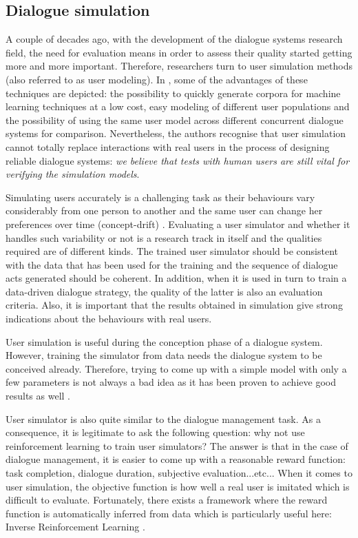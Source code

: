 	
	\subsection{Dialogue simulation}
	
		A couple of decades ago, with the development of the dialogue systems research field, the need for evaluation means in order to assess their quality started getting more and more important. Therefore, researchers turn to user simulation methods (also referred to as user modeling). In \cite{Eckert1997}, some of the advantages of these techniques are depicted: the possibility to quickly generate corpora for machine learning techniques at a low cost, easy modeling of different user populations and the possibility of using the same user model across different concurrent dialogue systems for comparison. Nevertheless, the authors recognise that user simulation cannot totally replace interactions with real users in the process of designing reliable dialogue systems: \textit{we believe that tests with human users are still vital for verifying the simulation models}.
			
			Simulating users accurately is a challenging task as their behaviours vary considerably from one person to another and the same user can change her preferences over time (concept-drift) \cite{Schatzmann2006}. Evaluating a user simulator and whether it handles such variability or not is a research track in itself \cite{Pietquin2013} and the qualities required are of different kinds. The trained user simulator should be consistent with the data that has been used for the training and the sequence of dialogue acts generated should be coherent. In addition, when it is used in turn to train a data-driven dialogue strategy, the quality of the latter is also an evaluation criteria. Also, it is important that the results obtained in simulation give strong indications about the behaviours with real users.
			
			User simulation is useful during the conception phase of a dialogue system. However, training the simulator from data needs the dialogue system to be conceived already. Therefore, trying to come up with a simple model with only a few parameters is not always a bad idea as it has been proven to achieve good results as well \cite{Schatzmann2007}.
			
			User simulator is also quite similar to the dialogue management task. As a consequence, it is legitimate to ask the following question: why not use reinforcement learning to train user simulators? The answer is that in the case of dialogue management, it is easier to come up with a reasonable reward function: task completion, dialogue duration, subjective evaluation...etc... When it comes to user simulation, the objective function is how well a real user is imitated which is difficult to evaluate. Fortunately, there exists a framework where the reward function is automatically inferred from data which is particularly useful here: Inverse Reinforcement Learning \cite{Russell1998,Chandramohan2011,El-Asri2012}.
			
